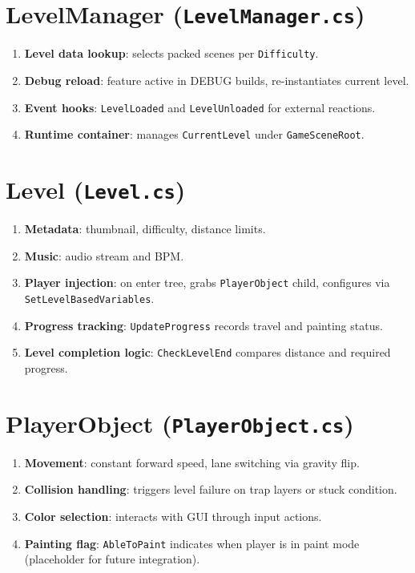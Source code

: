 \documentclass{report}
\begin{document}
\section{LevelManager (\texttt{LevelManager.cs})}
\begin{enumerate}[label=\alph*)]
	\item\textbf{Level data lookup}: selects packed scenes per \texttt{Difficulty}.
	\item\textbf{Debug reload}: feature active in DEBUG builds, re-instantiates current level.
	\item\textbf{Event hooks}: \texttt{LevelLoaded} and \texttt{LevelUnloaded} for external reactions.
	\item\textbf{Runtime container}: manages \texttt{CurrentLevel} under \texttt{GameSceneRoot}.
\end{enumerate}

\section{Level (\texttt{Level.cs})}
\begin{enumerate}[label=\alph*)]
	\item\textbf{Metadata}: thumbnail, difficulty, distance limits.
	\item\textbf{Music}: audio stream and BPM.
	\item\textbf{Player injection}: on enter tree, grabs \texttt{PlayerObject} child, configures via \texttt{SetLevelBasedVariables}.
	\item\textbf{Progress tracking}: \texttt{UpdateProgress} records travel and painting status.
	\item\textbf{Level completion logic}: \texttt{CheckLevelEnd} compares distance and required progress.
\end{enumerate}

\section{PlayerObject (\texttt{PlayerObject.cs})}
\begin{enumerate}[label=\alph*)]
	\item\textbf{Movement}: constant forward speed, lane switching via gravity flip.
	\item\textbf{Collision handling}: triggers level failure on trap layers or stuck condition.
	\item\textbf{Color selection}: interacts with GUI through input actions.
	\item\textbf{Painting flag}: \texttt{AbleToPaint} indicates when player is in paint mode (placeholder for future integration).
\end{enumerate}
\end{document}
